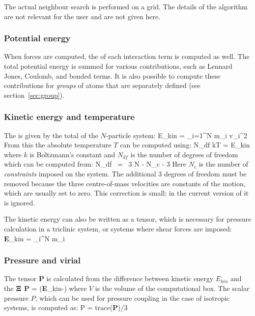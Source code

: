 The actual neighbour search is performed on a grid. The details of the
algorithm are not relevant for the user and are not given here.

\subsubsection*{Potential energy}
When forces are computed, the  of each interaction
term is computed as well. The total potential energy is summed for
various contributions, such as Lennard Jones, Coulomb, and bonded
terms. It is also possible to compute these contributions for {\em
groups} of atoms that are separately defined (see section~\ref{sec:group}).

\subsubsection*{Kinetic energy and temperature}
The  is given by the total  of the
$N$-particle system:
\beq
E_{kin} = \half \sum_{i=1}^N m_i v_i^2
\eeq
From this the absolute temperature $T$ can be computed using:
\beq
\half N_{df} kT = E_{kin}
\label{eq:E-T}
\eeq
where $k$ is Boltzmann's constant and $N_{df}$ is the number of
degrees of freedom which can be computed from:
\beq
N_{df}	~=~	3 N - N_c - 3
\eeq
Here $N_c$ is the number of {\em constraints} imposed on the system.
The additional 3 degrees of freedom must be removed because the three
centre-of-mass velocities are constants of the motion, which are usually
set to zero.  This correction is small; in the current version of
{\gromacs} it is ignored.

The kinetic energy can also be written as a tensor, which is necessary
for pressure calculation in a triclinic system, or systems where shear
forces  are imposed:
\beq
{\bf E}_{kin} = \half \sum_i^N m_i \vvi \otimes \vvi
\eeq

\subsubsection*{Pressure and virial}
The  
tensor {\bf P} is calculated from the difference between 
kinetic energy $E_{kin}$ and the  ${\bf \Xi}$
\beq
{\bf P} =  ({\bf E}_{kin}-{\bf \Xi})
\label{eq:P}
\eeq
where $V$ is the volume of the computational box. 
The scalar pressure $P$, which can be used for pressure coupling in the case
of isotropic systems, is computed as:
\beq
P	= {\rm trace}({\bf P})/3
\eeq


